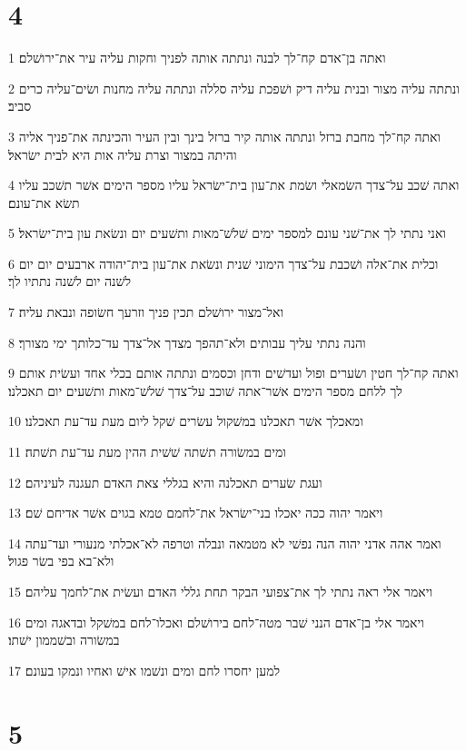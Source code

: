 \chapter{4}

\par 1 ואתה בן־אדם קח־לך לבנה ונתתה אותה לפניך וחקות עליה עיר את־ירושׁלם׃
\par 2 ונתתה עליה מצור ובנית עליה דיק ושׁפכת עליה סללה ונתתה עליה מחנות ושׂים־עליה כרים סביב׃
\par 3 ואתה קח־לך מחבת ברזל ונתתה אותה קיר ברזל בינך ובין העיר והכינתה את־פניך אליה והיתה במצור וצרת עליה אות היא לבית ישׂראל׃
\par 4 ואתה שׁכב על־צדך השׂמאלי ושׂמת את־עון בית־ישׂראל עליו מספר הימים אשׁר תשׁכב עליו תשׂא את־עונם׃
\par 5 ואני נתתי לך את־שׁני עונם למספר ימים שׁלשׁ־מאות ותשׁעים יום ונשׂאת עון בית־ישׂראל׃
\par 6 וכלית את־אלה ושׁכבת על־צדך הימוני שׁנית ונשׂאת את־עון בית־יהודה ארבעים יום יום לשׁנה יום לשׁנה נתתיו לך׃
\par 7 ואל־מצור ירושׁלם תכין פניך וזרעך חשׂופה ונבאת עליה׃
\par 8 והנה נתתי עליך עבותים ולא־תהפך מצדך אל־צדך עד־כלותך ימי מצורך׃
\par 9 ואתה קח־לך חטין ושׂערים ופול ועדשׁים ודחן וכסמים ונתתה אותם בכלי אחד ועשׂית אותם לך ללחם מספר הימים אשׁר־אתה שׁוכב על־צדך שׁלשׁ־מאות ותשׁעים יום תאכלנו׃
\par 10 ומאכלך אשׁר תאכלנו במשׁקול עשׂרים שׁקל ליום מעת עד־עת תאכלנו׃
\par 11 ומים במשׂורה תשׁתה שׁשׁית ההין מעת עד־עת תשׁתה׃
\par 12 ועגת שׂערים תאכלנה והיא בגללי צאת האדם תעגנה לעיניהם׃
\par 13 ויאמר יהוה ככה יאכלו בני־ישׂראל את־לחמם טמא בגוים אשׁר אדיחם שׁם׃
\par 14 ואמר אהה אדני יהוה הנה נפשׁי לא מטמאה ונבלה וטרפה לא־אכלתי מנעורי ועד־עתה ולא־בא בפי בשׂר פגול׃
\par 15 ויאמר אלי ראה נתתי לך את־צפועי הבקר תחת גללי האדם ועשׂית את־לחמך עליהם׃
\par 16 ויאמר אלי בן־אדם הנני שׁבר מטה־לחם בירושׁלם ואכלו־לחם במשׁקל ובדאגה ומים במשׂורה ובשׁממון ישׁתו׃
\par 17 למען יחסרו לחם ומים ונשׁמו אישׁ ואחיו ונמקו בעונם׃

\chapter{5}

